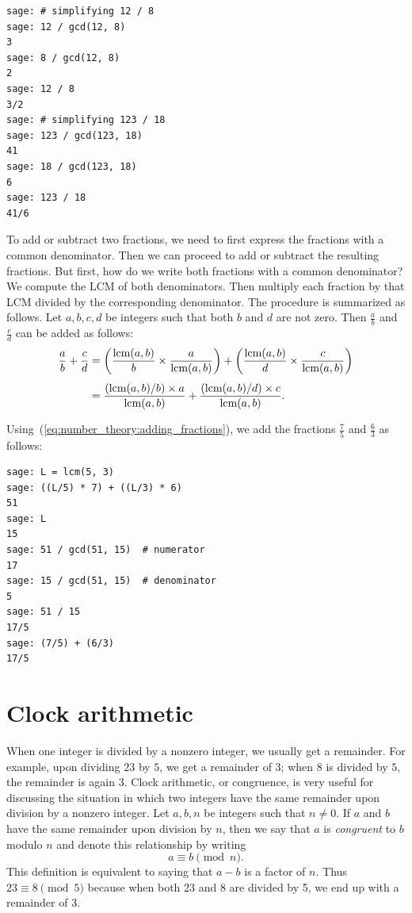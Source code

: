 \begin{lstlisting}
sage: # simplifying 12 / 8
sage: 12 / gcd(12, 8)
3
sage: 8 / gcd(12, 8)
2
sage: 12 / 8
3/2
sage: # simplifying 123 / 18
sage: 123 / gcd(123, 18)
41
sage: 18 / gcd(123, 18)
6
sage: 123 / 18
41/6
\end{lstlisting}

To add or subtract two fractions, we need to first express the
fractions with a common denominator. Then we can proceed to add or
subtract the resulting fractions. But first, how do we write both
fractions with a common denominator? We compute the LCM of both
denominators. Then multiply each fraction by that LCM divided by the
corresponding denominator. The procedure is summarized as follows. Let
$a,b,c,d$ be integers such that both $b$ and $d$ are not zero. Then
$\frac{a}{b}$ and $\frac{c}{d}$ can be added as follows:
%
\begin{equation}
\label{eq:number_theory:adding_fractions}
\begin{aligned}
\frac{a}{b} + \frac{c}{d}
&=
\left( \frac{\operatorname*{\text{lcm}}(a,b)}{b} \times \frac{a}{\operatorname*{\text{lcm}}(a,b)} \right)
+
\left( \frac{\operatorname*{\text{lcm}}(a,b)}{d} \times \frac{c}{\operatorname*{\text{lcm}}(a,b)} \right) \\[4pt]
&=
\frac{(\operatorname*{\text{lcm}}(a,b) / b) \times a} {\operatorname*{\text{lcm}}(a,b)}
+
\frac{(\operatorname*{\text{lcm}}(a,b) / d) \times c} {\operatorname*{\text{lcm}}(a,b)}.
\end{aligned}
\end{equation}

Using~(\ref{eq:number_theory:adding_fractions}), we add the fractions
$\frac{7}{5}$ and $\frac{6}{3}$ as follows:

\begin{lstlisting}
sage: L = lcm(5, 3)
sage: ((L/5) * 7) + ((L/3) * 6)
51
sage: L
15
sage: 51 / gcd(51, 15)  # numerator
17
sage: 15 / gcd(51, 15)  # denominator
5
sage: 51 / 15
17/5
sage: (7/5) + (6/3)
17/5
\end{lstlisting}



\section{Clock arithmetic}

When one integer is divided by a nonzero integer, we usually get a
remainder. For example, upon dividing $23$ by $5$, we get a remainder
of $3$; when $8$ is divided by $5$, the remainder is again $3$. Clock
arithmetic, or congruence, is very useful for discussing the situation
in which two integers have the same remainder upon division by a
nonzero integer. Let $a,b,n$ be integers such that $n \neq 0$. If $a$
and $b$ have the same remainder upon division by $n$, then we say that
$a$ is \emph{congruent} to $b$ modulo $n$ and denote
this relationship by writing
\[
a \equiv b \pmod{n}.
\]
This definition is equivalent to saying that $a - b$ is a factor of
$n$. Thus $23 \equiv 8 \pmod{5}$ because when both 23 and 8 are
divided by 5, we end up with a remainder of 3.

